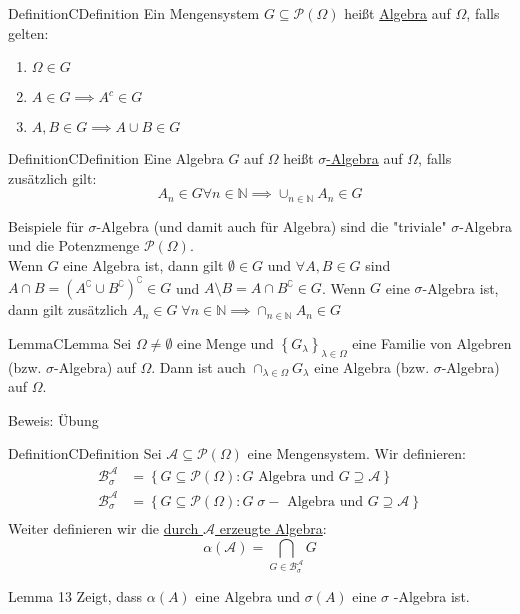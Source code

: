 \documentclass[11.5 pt, a4paper]{memoir}
\begin{document}
\begin{ibox}[1.1]{Definition}{CDefinition}
	Ein Mengensystem $ G \subseteq \mathcal{P} (\Omega) $ heißt \underline{Algebra} auf $ \Omega  $, falls gelten:
	\begin{enumerate}[label=\alph*)]
		\item $ \Omega  \in G $ 
		\item $ A \in G \implies A^{c} \in G $ 
		\item $ A, B \in G \implies A \cup B \in G $ 
	\end{enumerate}
\end{ibox}
\begin{ibox}[1.2]{Definition}{CDefinition}
	Eine Algebra $ G $ auf $ \Omega  $ heißt \underline{ $ \sigma $-Algebra} auf $ \Omega $, falls zusätzlich gilt:
	$$ A_n \in G \forall n \in \mathbb{N} \implies \cup_{ n \in \mathbb{N}} A_n \in G $$
\end{ibox}
Beispiele für $ \sigma $-Algebra (und damit auch für Algebra) sind die "triviale" 	$ \sigma $-Algebra und die Potenzmenge $ \mathcal{P} (\Omega) $. \\
Wenn $ G $ eine Algebra ist, dann gilt $ \emptyset \in G $ und $ \forall A, B \in G $ sind $ A \cap B = \left( A^\complement \cup B^\complement \right)^\complement \in G $ und $ A \setminus B = A \cap B^\complement \in G $. Wenn $ G $ eine $ \sigma $-Algebra ist, dann gilt
zusätzlich $ A_n \in G \; \forall n \in \mathbb{N} \implies \cap_{n \in \mathbb{N}}A_n \in G $ 

\begin{ibox}[1.3]{Lemma}{CLemma}
    Sei $ \Omega \neq \emptyset $ eine Menge und $ \left\{ G_{\lambda} \right\}_{\lambda \in \Omega } $ eine Familie von Algebren
		(bzw. $ \sigma $-Algebra) auf $ \Omega  $. Dann ist auch $ \cap_{\lambda \in \Omega } G_{\lambda} $ eine Algebra (bzw. $ \sigma $-Algebra) auf $ \Omega  $.
\end{ibox}
Beweis: Übung

\begin{ibox}[1.4]{Definition}{CDefinition}
    Sei $ \mathcal{A} \subseteq \mathcal{P} (\Omega) $ eine Mengensystem. Wir definieren: 
		\begin{align*}
			\mathcal{B}^{ \mathcal{A}}_{\sigma} &= \left\{ G \subseteq \mathcal{P} (\Omega) : G \text{ Algebra und  } G \supseteq \mathcal{A} \right\} \\
			\mathcal{B}^{ \mathcal{A}}_{\sigma} &= \left\{ G \subseteq \mathcal{P} (\Omega) : G \; \sigma -\text{ Algebra und  } G \supseteq \mathcal{A} \right\} \\
		\end{align*}
		Weiter definieren wir die \underline{durch $ \mathcal{A} $ erzeugte Algebra}:
		$$ \alpha ( \mathcal{A}) = \bigcap_{G \in 	\mathcal{B}^{ \mathcal{A}}_{\sigma}} G $$
\end{ibox}
Lemma 13 Zeigt, dass $ \alpha (A) $ eine Algebra und $ \sigma (A) $ eine $ \sigma $ -Algebra ist.
\end{document}
